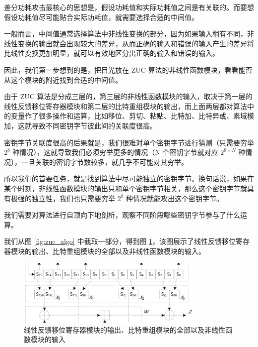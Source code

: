 差分功耗攻击最核心的思想是，假设功耗值和实际功耗值之间是有关联的。而要想假设功耗值尽可能贴合实际功耗值，就需要选择合适的中间值。

一般而言，中间值通常选择算法中非线性变换的部分，因为如果输入稍有不同，非线性变换的输出就会出现较大的差异，从而正确的输入和错误的输入产生的差异将比线性变换更加明显，就可以有效地区分出正确的输入和错误的输入。

因此，我们第一步想到的是，把目光放在 ZUC 算法的非线性函数模块，看看能否从这个模块的附近找到合适的中间值。


\vspace*{0.5\baselineskip}

由于 ZUC 算法是分成三层的，第三层的非线性函数模块的输入，取决于第一层的线性反馈移位寄存器模块和第二层的比特重组模块的输出，而上面两层都对算法中的变量作了很多操作和运算，比如移位、剪切、粘贴、比特加、比特异或、素域模加，这就导致不同密钥字节彼此间的关联度很高。

密钥字节关联度很高的后果就是，我们很难对单个密钥字节进行猜测（只需要穷举 $2^8$ 种情况），这就导致我们必须穷举更多的情况（N 个密钥字节就对应 $2^{8 \times N}$ 种情况），一旦关联的密钥字节数较多，就几乎不可能对其穷举。

所以我们的首要任务，就是找到算法中尽可能独立的密钥字节。换句话说，如果在某个时刻，非线性函数模块的输出只和单个密钥字节相关，那么这个密钥字节就具有极强的独立性，我们也只需要穷举 $2^8$ 种情况就能攻出这个密钥字节。

我们需要对算法进行自顶向下地剖析，观察不同阶段哪些密钥字节参与了什么运算。

\vspace*{0.5\baselineskip}

我们从图 \ref{fig:zuc_algo} 中截取一部分，得到图 \ref{fig:zuc_lfsr_br}，该图展示了线性反馈移位寄存器模块的输出、比特重组模块的全部以及非线性函数模块的输入。

\begin{figure}[htbp]
    \centering
    \includegraphics[width=0.8\textwidth]{../images/zuc_lfsr_br.png}
    \caption{线性反馈移位寄存器模块的输出、比特重组模块的全部以及非线性函数模块的输入}
    \label{fig:zuc_lfsr_br}
\end{figure}


